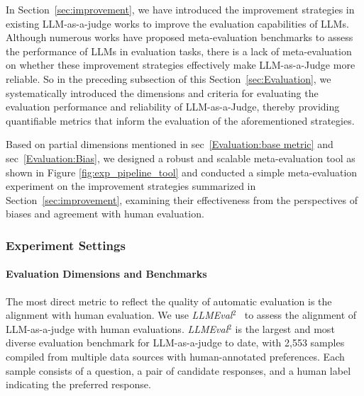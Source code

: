 \documentclass[acmsmall,screen]{acmart}
\begin{document}
In Section~\ref{sec:improvement}, we have introduced the improvement strategies in existing LLM-as-a-judge works to improve the evaluation capabilities of LLMs. 
Although numerous works have proposed meta-evaluation benchmarks to assess the performance of LLMs in evaluation tasks, there is a lack of meta-evaluation on whether these improvement strategies effectively make LLM-as-a-Judge more reliable.
So in the preceding subsection of this Section~\ref{sec:Evaluation}, we systematically introduced the dimensions and criteria for evaluating the evaluation performance and reliability of LLM-as-a-Judge, thereby providing quantifiable metrics that inform the evaluation of the aforementioned strategies.

Based on partial dimensions mentioned in sec~\ref{Evaluation:base metric} and sec~\ref{Evaluation:Bias}, we designed a robust and scalable meta-evaluation tool as shown in Figure \ref{fig:exp_pipeline_tool} and conducted a simple meta-evaluation experiment on the improvement strategies summarized in Section~\ref{sec:improvement}, examining their effectiveness from the perspectives of biases and agreement with human evaluation.

\subsubsection{\textbf{Experiment Settings}}
\label{subsec:exp_settings}

\paragraph{\textbf{Evaluation Dimensions and Benchmarks}}
The most direct metric to reflect the quality of automatic evaluation is the alignment with human evaluation. We use \textit{LLMEval$^2$}~\citep{zhang2023wider} to assess the alignment of LLM-as-a-judge with human evaluations. \textit{LLMEval$^2$} is the largest and most diverse evaluation benchmark for LLM-as-a-judge to date, with 2,553 samples compiled from multiple data sources with human-annotated preferences. Each sample consists of a question, a pair of candidate responses, and a human label indicating the preferred response.
\end{document}
